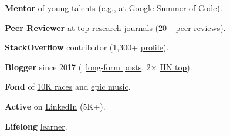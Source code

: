 \documentclass{files/CV/cesar}
\begin{document}
\textbf{Mentor} of young talents (e.g., at \href{https://summerofcode.withgoogle.com/archive/2021/projects/6679675211874304}{Google Summer of Code}).

\textbf{Peer Reviewer} at top research journals (20+ \href{https://www.cesarsotovalero.net/service#academic-reviewer}{peer reviews}).

\textbf{StackOverflow} contributor (1,300+ \href{https://stackoverflow.com/users/10480869/cesarsotovalero}{profile}).

\textbf{Blogger} since 2017 (\blogposts~\href{https://www.cesarsotovalero.net/blog}{long-form posts}, 2$\times$ \href{https://news.ycombinator.com/favorites?id=cesarsotovalero}{HN top}).

\textbf{Fond} of \href{https://www.cesarsotovalero.net/races.html}{10K races} and \href{https://open.spotify.com/playlist/1E4xBA3IYuTjtTphOV16FM}{epic music}.

\textbf{Active} on \href{https://www.cesarsotovalero.net/linkedin}{LinkedIn} (5K+).

\textbf{Lifelong} \href{https://www.cesarsotovalero.net/courses.html}{learner}.
\end{document}
